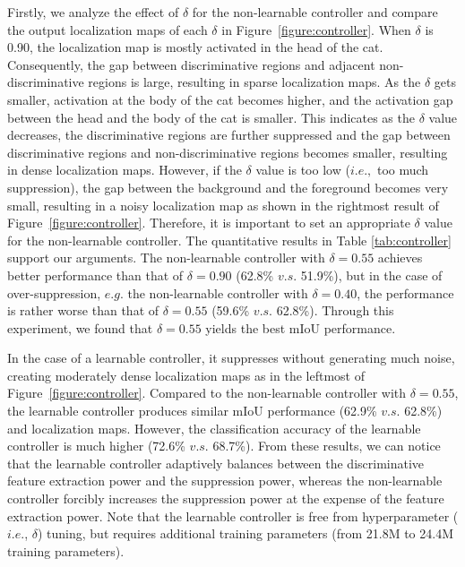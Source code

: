 \documentclass[letterpaper]{article} \usepackage{aaai21}  \usepackage{times}  \usepackage{helvet} \usepackage{courier}  \usepackage[hyphens]{url}  \usepackage{graphicx} \urlstyle{rm} \def\UrlFont{\rm}  \usepackage{natbib}  \usepackage{caption} \frenchspacing  \setlength{\pdfpagewidth}{8.5in}  \setlength{\pdfpageheight}{11in}
\begin{document}
Firstly, we analyze the effect of $\delta$ for the non-learnable controller and compare the output localization maps of each $\delta$ in Figure~\ref{figure:controller}.
When $\delta$ is 0.90, the localization map is mostly activated in the head of the cat.
Consequently, the gap between discriminative regions and adjacent non-discriminative regions is large, resulting in sparse localization maps.
As the $\delta$ gets smaller, activation at the body of the cat becomes higher, and the activation gap between the head and the body of the cat is smaller.
This indicates as the $\delta$ value decreases, the discriminative regions are further suppressed and the gap between discriminative regions and non-discriminative regions becomes smaller, resulting in dense localization maps.
However, if the $\delta$ value is too low ($i.e.,$ too much suppression), the gap between the background and the foreground becomes very small, resulting in a noisy localization map as shown in the rightmost result of Figure~\ref{figure:controller}.
Therefore, it is important to set an appropriate $\delta$ value for the non-learnable controller.
The quantitative results in Table \ref{tab:controller} support our arguments. 
The non-learnable controller with $\delta=0.55$ achieves better performance than that of $\delta=0.90$ (62.8\% $v.s.$ 51.9\%), but in the case of over-suppression, $e.g.$ the non-learnable controller with $\delta=0.40$, the performance is rather worse than that of $\delta=0.55$ (59.6\% $v.s.$ 62.8\%).
Through this experiment, we found that $\delta=0.55$ yields the best mIoU performance.

In the case of a learnable controller, it suppresses without generating much noise, creating moderately dense localization maps as in the leftmost of Figure~\ref{figure:controller}.
Compared to the non-learnable controller with $\delta=0.55$, the learnable controller produces similar mIoU performance (62.9\% $v.s.$ 62.8\%) and localization maps.
However, the classification accuracy of the learnable controller is much higher (72.6\% $v.s.$ 68.7\%).
From these results, we can notice that the learnable controller adaptively balances between the discriminative feature extraction power and the suppression power, whereas the non-learnable controller forcibly increases the suppression power at the expense of the feature extraction power.
Note that the learnable controller is free from hyperparameter ($i.e.$, $\delta$) tuning, but requires additional training parameters (from 21.8M to 24.4M training parameters).
\end{document}
